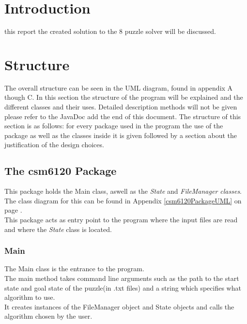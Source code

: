 \documentclass[journal]{IEEEtran}
\begin{document}
\section{Introduction}
% 
% 
% 
% 
 this report the  created solution to the 8 puzzle solver will be discussed.

\section{Structure}\label{sec:structure}
The overall structure can be seen in the UML diagram, found in appendix A though C.
In this section the structure of the program will be explained and the different classes and their uses. Detailed description methods will not be given please refer to the JavaDoc 
add the end of this document.
The structure of this section is as follows: for every package used in the program the use of the package as well as the classes inside it is given followed by a section about the justification of the design choices. 

\subsection{The csm6120 Package}\label{sec:csm6120Package}
This package holds the Main class, aswell as the \textit{State} and \textit{FileManager classes}. \\
The class diagram for this can be found in Appendix \ref{csm6120PackageUML} on page \pageref{csm6120PackageUML}.\\
This package acts as entry point to the program where the input files are read and where the \textit{State} class is located. \\

\subsubsection{Main}
The Main class is the entrance to the program. \\
The main method takes command line arguments such as the path to the start state and goal state of the puzzle(in .txt files) and a string which specifies what algorithm to use. \\
It creates instances of the FileManager object and State objects and calls the algorithm chosen by the user.\\
\end{document}
